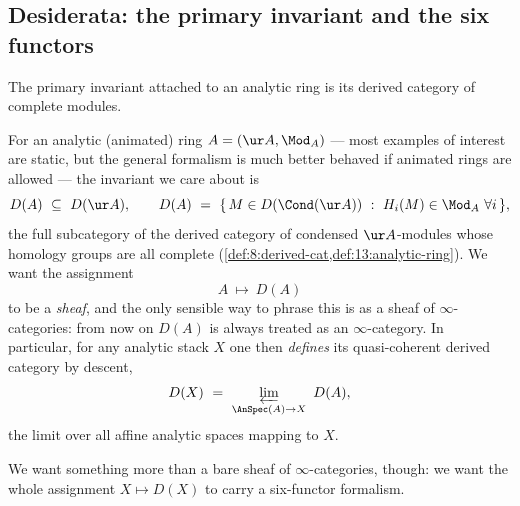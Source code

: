 \subsection{Desiderata: the primary invariant and the six functors}
\label{subsec:16:desiderata}

The primary invariant attached to an analytic ring is its derived category of
complete modules.

\begin{remark}
\label{rmk:16:primary-invariant}
For an analytic (animated) ring $A=(\ur A,\Mod_A)$ --- most examples of interest are
static, but the general formalism is much better behaved if animated rings are
allowed --- the invariant we care about is
\begin{equation*}
D(A)\ \subseteq\ D(\ur A),\qquad
D(A)\ =\ \{\,M\in D(\Cond(\ur A))\ :\ H_i(M)\in\Mod_A\ \forall i\,\},
\end{equation*}
the full subcategory of the derived category of condensed $\ur A$-modules whose
homology groups are all complete (\cref{def:8:derived-cat,def:13:analytic-ring}). We
want the assignment
\begin{equation*}
A\ \longmapsto\ D(A)
\end{equation*}
to be a \emph{sheaf}, and the only sensible way to phrase this is as a sheaf of
$\infty$-categories: from now on $D(A)$ is always treated as an $\infty$-category.
In particular, for any analytic stack $X$ one then \emph{defines} its
quasi-coherent derived category by descent,
\begin{equation*}
D(X)\ =\ \varprojlim_{\AnSpec(A)\to X}\ D(A),
\end{equation*}
the limit over all affine analytic spaces mapping to $X$.
\end{remark}

We want something more than a bare sheaf of $\infty$-categories, though: we want the
whole assignment $X\mapsto D(X)$ to carry a six-functor formalism.

